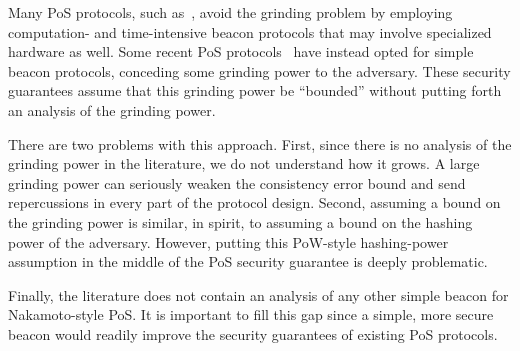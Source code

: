 Many PoS protocols, such as~\cite{Ouroboros,Etherium}, 
avoid the grinding problem 
by employing computation- and time-intensive 
beacon protocols that may involve specialized hardware as well. 
Some recent PoS protocols~\cite{Praos,SnowWhite}  
have instead opted for simple beacon protocols, 
conceding some grinding power to the adversary.
These security guarantees assume that this grinding power be ``bounded'' 
without putting forth an analysis of the grinding power.

There are two problems with this approach.
First, since there is no analysis of the grinding power in the literature, 
we do not understand how it grows. 
A large grinding power can seriously weaken the consistency error bound and 
send repercussions in every part of the protocol design. 
Second, 
assuming a bound on the grinding power is similar, in spirit, to 
assuming a bound on the hashing power of the adversary. 
However, putting this PoW-style hashing-power assumption 
in the middle of the PoS security guarantee 
is deeply problematic.

Finally, the literature does not contain an analysis of 
any other simple beacon for Nakamoto-style PoS. 
It is important to fill this gap 
since a simple, more secure beacon 
would readily improve the security guarantees of existing PoS protocols.















